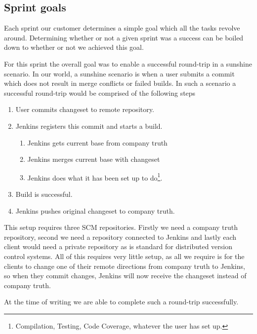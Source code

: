 \documentclass[a4paper]{article}
\begin{document}
\subsection{Sprint goals}
\label{sec:goal}
Each sprint our customer determines a simple goal which all the tasks revolve
around. Determining whether or not a given sprint was a success can be boiled
down to whether or not we achieved this goal.

For this sprint the overall goal was to enable a successful round-trip in a
sunshine scenario. In our world, a sunshine scenario is when a user submits a
commit which does not result in merge conflicts or failed builds. In such a
scenario a successful round-trip would be comprised of the following steps
\begin{enumerate}
	\item User commits changeset to remote repository.
	\item Jenkins registers this commit and starts a build.
		\begin{enumerate}
			\item Jenkins gets current base from company truth
			\item Jenkins merges current base with changeset
			\item Jenkins does what it has been set up to do\footnote{Compilation,
				Testing, Code Coverage, whatever the user has set up.}.
		\end{enumerate}
	\item Build is successful.
	\item Jenkins pushes original changeset to company truth.
\end{enumerate}

This setup requires three SCM repositories. Firstly we need a company truth
repository, second we need a repository connected to Jenkins and lastly each
client would need a private repository as is standard for distributed version
control systems. All of this requires very little setup, as all we require is
for the clients to change one of their remote directions from company truth to
Jenkins, so when they commit changes, Jenkins will now receive the changeset instead of company truth.

At the time of writing we are able to complete such a round-trip successfully.
\end{document}
